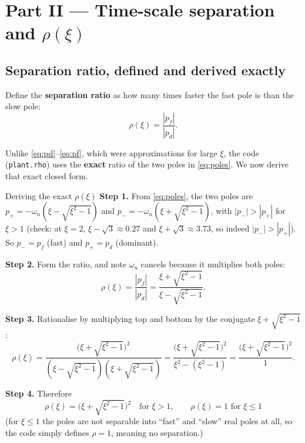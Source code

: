 \documentclass[11pt,a4paper]{article}
\begin{document}
\section{Part II --- Time-scale separation and $\rho(\xi)$}
\label{sec:rho}

\subsection{Separation ratio, defined and derived exactly}

Define the \textbf{separation ratio} as how many times faster the fast pole
is than the slow pole:
\begin{equation}
\rho(\xi) = \frac{|p_f|}{|p_d|}.
\label{eq:rho_def}
\end{equation}

Unlike \eqref{eq:pd}--\eqref{eq:pf}, which were approximations for large
$\xi$, the code (\texttt{plant.rho}) uses the \textbf{exact} ratio of the two
poles in \eqref{eq:poles}. We now derive that exact closed form.

\begin{stepbox}{Deriving the exact $\rho(\xi)$}
\textbf{Step 1.} From \eqref{eq:poles}, the two poles are
$p_+=-\omega_n(\xi-\sqrt{\xi^2-1})$ and $p_-=-\omega_n(\xi+\sqrt{\xi^2-1})$,
with $|p_-|>|p_+|$ for $\xi>1$ (check: at $\xi=2$, $\xi-\sqrt3\approx0.27$ and
$\xi+\sqrt3\approx3.73$, so indeed $|p_-|>|p_+|$). So $p_-=p_f$ (fast) and
$p_+=p_d$ (dominant).

\textbf{Step 2.} Form the ratio, and note $\omega_n$ cancels because it
multiplies both poles:
\[
\rho(\xi) = \frac{|p_f|}{|p_d|} = \frac{\xi+\sqrt{\xi^2-1}}{\xi-\sqrt{\xi^2-1}}.
\]

\textbf{Step 3.} Rationalise by multiplying top and bottom by the conjugate
$\xi+\sqrt{\xi^2-1}$:
\[
\rho(\xi) = \frac{\bigl(\xi+\sqrt{\xi^2-1}\bigr)^2}{(\xi-\sqrt{\xi^2-1})(\xi+\sqrt{\xi^2-1})}
= \frac{\bigl(\xi+\sqrt{\xi^2-1}\bigr)^2}{\xi^2-(\xi^2-1)}
= \frac{\bigl(\xi+\sqrt{\xi^2-1}\bigr)^2}{1}.
\]

\textbf{Step 4.} Therefore
\begin{equation}
\boxed{\;\rho(\xi) = \bigl(\xi + \sqrt{\xi^2-1}\bigr)^2 \quad\text{for }\xi>1,
\qquad \rho(\xi)=1 \text{ for }\xi\le 1\;}
\label{eq:rho}
\end{equation}
(for $\xi\le1$ the poles are not separable into ``fast'' and ``slow'' real
poles at all, so the code simply defines $\rho=1$, meaning no separation.)
\end{stepbox}
\end{document}
